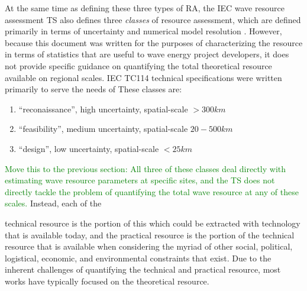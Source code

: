 At the same time as defining these three types of RA, the IEC wave resource assessment TS also defines three {\em classes} of resource assessment, which are defined primarily in terms of uncertainty and numerical model resolution \citep{internationalelectrotechnicalcommissionPart101Wave2015}. However, because this document was written for the purposes of characterizing the resource in terms of statistics that are useful to wave energy project developers, it does not provide specific guidance on quantifying the total theoretical resource available on regional scales. 
IEC TC114 technical specifications were written primarily to serve the needs of  These classes are:
\begin{enumerate}
\item ``reconaissance'', high uncertainty, spatial-scale $>300 km$
\item ``feasibility'', medium uncertainty, spatial-scale $20- 500 km$
\item ``design'', low uncertainty, spatial-scale $<25 km$
\end{enumerate}

\textcolor{green}{Move this to the previous section:
All three of these classes deal directly with estimating wave resource parameters at specific sites, and the TS does not directly tackle the problem of quantifying the total wave resource at any of these scales.} Instead, each of the 

  
technical resource is the portion of this which could be extracted with
technology that is available today, and the practical resource is the portion
of the technical resource that is available when considering the myriad of other social, political, logistical,
economic, and environmental constraints that exist. Due to the inherent challenges of
quantifying the technical and practical resource, most works have typically
focused on the theoretical resource.


